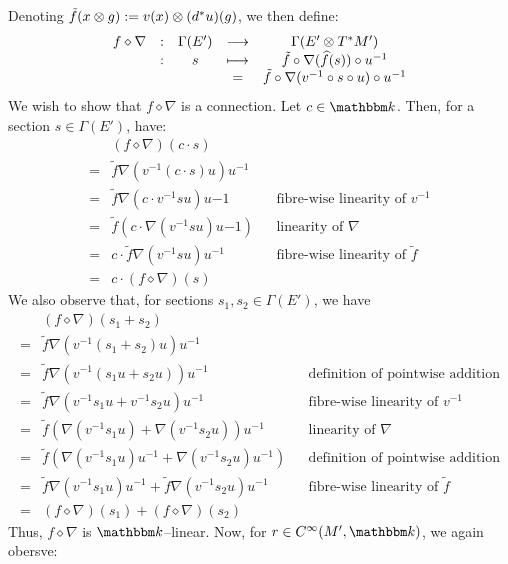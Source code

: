 Denoting $\tilde{f}(x \otimes g) := v(x) \otimes (d^*u)(g)$, we then define:
\[\begin{array}{ccccc}
f \diamond \nabla
&:& \Gamma(E') &\stackrel{}{\longrightarrow}    & \Gamma(E' \otimes T^*M') \\
&:& s &\longmapsto& \tilde{f} \circ \nabla(\widehat{f}(s)) \circ u^{-1} \\
&&& = &
  \tilde{f} \circ \nabla(v^{-1} \circ s \circ u) \circ u^{-1}
\end{array}\]
We wish to show that $f \diamond \nabla$ is a connection.
Let $c \in \K$. Then, for a section $s \in \Gamma(E')$, have:
\begin{align*}
   & (f \diamond \nabla)(c \cdot s) \\
  =& \tilde{f}\nabla(v^{-1}(c \cdot s)u)u^{-1} \\
  =& \tilde{f}\nabla(c \cdot v^{-1}su)u{-1}
      && \text{fibre-wise linearity of } v^{-1} \\
  =& \tilde{f} (c \cdot  \nabla(v^{-1}su)u{-1})
      && \text{linearity of } \nabla \\
  =& c \cdot \tilde{f}\nabla(v^{-1}su)u^{-1}
      && \text{fibre-wise linearity of } \tilde{f} \\
  =& c \cdot (f \diamond \nabla)(s)
\end{align*}
We also observe that, for sections $s_1, s_2 \in \Gamma(E')$, we have
\begin{align*}
   & (f \diamond \nabla)(s_1 + s_2)\\
  =& \tilde{f}\nabla(v^{-1}(s_1 + s_2)u)u^{-1} \\
  =& \tilde{f}\nabla(v^{-1}(s_1u + s_2u))u^{-1}
    && \text{definition of pointwise addition} \\
  =& \tilde{f}\nabla(v^{-1}s_1u + v^{-1}s_2u)u^{-1}
    && \text{fibre-wise linearity of } v^{-1} \\
  =& \tilde{f}(\nabla(v^{-1}s_1u)
    + \nabla(v^{-1}s_2u))u^{-1}
    && \text{linearity of } \nabla \\
  =& \tilde{f}(\nabla(v^{-1}s_1u)u^{-1}
    + \nabla(v^{-1}s_2u)u^{-1})
    && \text{definition of pointwise addition} \\
  =& \tilde{f}\nabla(v^{-1}s_1u)u^{-1}
    + \tilde{f}\nabla(v^{-1}s_2u)u^{-1}
    && \text{fibre-wise linearity of } \tilde{f} \\
  =& (f \diamond \nabla)(s_1) + (f \diamond \nabla)(s_2)
\end{align*}
Thus, $f \diamond \nabla$ is $\K$--linear. Now, for $r \in \Cinf(M', \K)$, we
again obersve:
